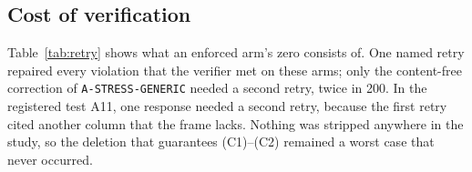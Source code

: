 \documentclass[smallextended,natbib]{svjour3}
\begin{document}
\begin{table}[!htbp]
\caption{What the verifier did on the enforced arms (reference battery and
the profile task), $N=200$ each. A response is \emph{clean} when its first
attempt satisfied (C1)--(C2); otherwise one named retry repaired the
response. No
response on these arms needed a second retry, and none was stripped.
\texttt{A-GR-CHOICES} ran on 2026-09-18. Calls and wall-clock
latency are per response; \texttt{A-L1} and \texttt{P-L1} are the unenforced
baselines.}
\label{tab:retry}
\centering
\footnotesize
\setlength{\tabcolsep}{4pt}
\end{table}

\subsection{Cost of verification}

Table~\ref{tab:retry} shows what an enforced arm's zero consists of. One named
retry repaired every violation that the verifier met on these arms; only the
content-free correction of \texttt{A-STRESS-GENERIC} needed a second retry,
twice in 200. In the registered test A11, one response needed a second retry,
because the first retry cited another column that the frame lacks. Nothing was stripped anywhere in the study, so the deletion that
guarantees (C1)--(C2) remained a worst case that never occurred.
\end{document}
